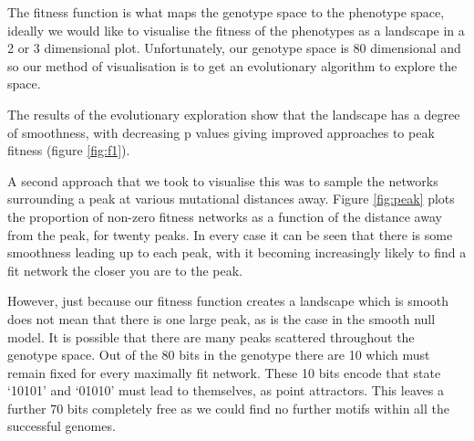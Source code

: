 \documentclass[a4paper,11pt]{article}
\begin{document}
The fitness function is what maps the genotype space to the phenotype space, ideally we would like to visualise the fitness of the phenotypes as a landscape in a 2 or 3 dimensional plot. Unfortunately, our genotype space is 80 dimensional and so our method of visualisation is to get an evolutionary algorithm to explore the space.\par

The results of the evolutionary exploration show that the landscape has a degree of smoothness, with decreasing p values giving improved approaches to peak fitness (figure \ref{fig:f1}).\par

A second approach that we took to visualise this was to sample the networks surrounding a peak at various mutational distances away. Figure \ref{fig:peak} plots the proportion of non-zero fitness networks as a function of the distance away from the peak, for twenty peaks. In every case it can be seen that there is some smoothness leading up to each peak, with it becoming increasingly likely to find a fit network the closer you are to the peak.\par

However, just because our fitness function creates a landscape which is smooth does not mean that there is one large peak, as is the case in the smooth null model. It is possible that there are many peaks scattered throughout the genotype space. Out of the 80 bits in the genotype there are 10 which must remain fixed for every maximally fit network. These 10 bits encode that state `10101' and `01010' must lead to themselves, as point attractors. This leaves a further 70 bits completely free as we could find no further motifs within all the successful genomes.\par
\end{document}
